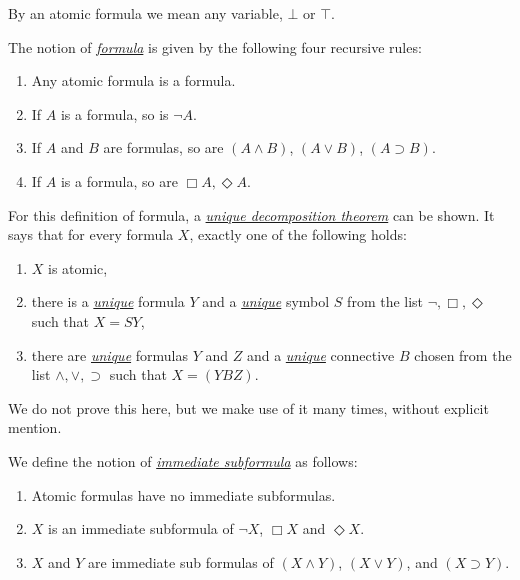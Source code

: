By an atomic formula we mean any variable, $\bot$ or $\top$.



The notion of \underline{\textit{formula}} is given by the following four recursive rules:
\begin{enumerate}[itemsep=5pt,parsep=5pt,leftmargin=3em,topsep=5pt,label=\arabic*)] %
    \item Any atomic formula is a formula.

    \item If $A$ is a formula, so is $\neg A$.

    \item If $A$ and $B$ are formulas, so are $(A \land B)$, $(A \lor B)$, $(A \supset B)$.

    \item If $A$ is a formula, so are $\Box A, \Diamond A$.
\end{enumerate}


For this definition of formula, 
a \underline{\textit{unique decomposition theorem}} can be shown.
% 
It says that for every formula $X$,
exactly one of the following holds:
\begin{enumerate}[itemsep=5pt,parsep=5pt,leftmargin=3em,topsep=5pt,label=\arabic*)] %
    \item $X$ is atomic,

    \item there is a \underline{\textit{unique}} formula $Y$ and a \underline{\textit{unique}} symbol $S$ from the list $\neg,\Box,\Diamond$ such that $X = SY$,

    \item there are \underline{\textit{unique}} formulas $Y$ and $Z$ and a \underline{\textit{unique}} connective $B$ chosen from the list $\land,\lor,\supset$ such that $X = (YBZ)$.
\end{enumerate}






We do not prove this here, 
but we make use of it many times, 
without explicit mention.



We define the notion of \underline{\textit{immediate subformula}} as follows:
\begin{enumerate}[itemsep=5pt,parsep=5pt,leftmargin=3em,topsep=5pt,label=(\arabic*)] %
    \item Atomic formulas have no immediate subformulas.

    \item $X$ is an immediate subformula of $\neg X$, $\Box X$ and $\Diamond X$.

    \item $X$ and $Y$ are immediate sub formulas of $(X \land Y)$, $(X \lor Y)$, and $(X \supset Y)$.
\end{enumerate}


